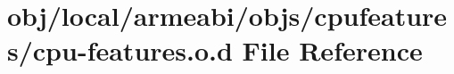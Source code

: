 \hypertarget{objs_2cpufeatures_2cpu-features_8o_8d}{\section{obj/local/armeabi/objs/cpufeatures/cpu-\/features.o.\-d \-File \-Reference}
\label{objs_2cpufeatures_2cpu-features_8o_8d}
}
